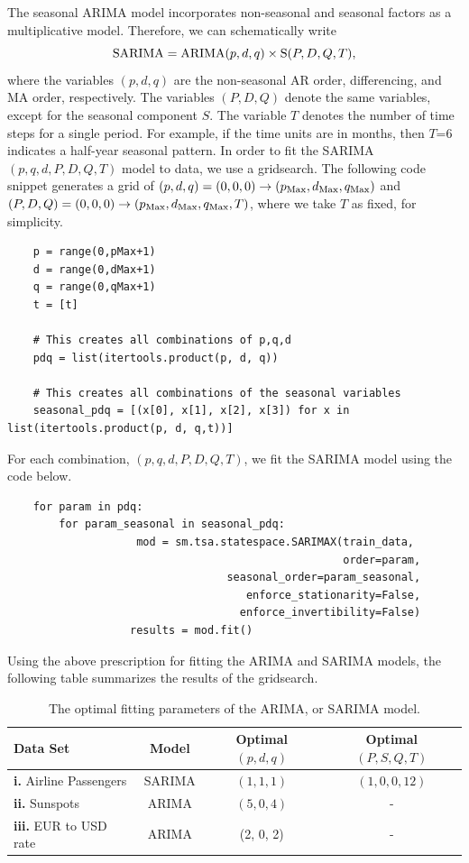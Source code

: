 \documentclass[10pt,a4paper]{article}
\begin{document}
The seasonal ARIMA model incorporates non-seasonal and seasonal factors as a multiplicative model. Therefore, we can schematically write
\begin{equation}
{\rm SARIMA} = {\rm ARIMA}(p,d,q) \times {\rm S}(P,D,Q,T),
\end{equation}
where the variables $(p,d,q)$ are the non-seasonal AR order, differencing, and MA order, respectively. The variables $(P,D,Q)$ denote the same variables, except for the seasonal component $S$. The variable $T$ denotes the number of time steps for a single period. For example, if the time units are in months, then $T$=6 indicates a half-year seasonal pattern. In order to fit the SARIMA$(p,q,d,P,D,Q,T)$ model to data, we use a gridsearch. The following code snippet generates a grid of $(p,d,q)=(0,0,0) \rightarrow (p_{\rm Max},d_{\rm Max},q_{\rm Max}) $ and $(P,D,Q)=(0,0,0) \rightarrow (p_{\rm Max},d_{\rm Max},q_{\rm Max},T) $, where we take $T$ as fixed, for simplicity.
\begin{lstlisting}
	p = range(0,pMax+1)
	d = range(0,dMax+1)
	q = range(0,qMax+1)
	t = [t]
	
	# This creates all combinations of p,q,d
	pdq = list(itertools.product(p, d, q))
	
	# This creates all combinations of the seasonal variables
	seasonal_pdq = [(x[0], x[1], x[2], x[3]) for x in list(itertools.product(p, d, q,t))]
\end{lstlisting}
For each combination, $(p,q,d,P,D,Q,T)$, we fit the SARIMA model using the code below.
\begin{lstlisting}
	for param in pdq:
		for param_seasonal in seasonal_pdq:
					mod = sm.tsa.statespace.SARIMAX(train_data,
                            					    order=param,
                            	  seasonal_order=param_seasonal,
                                     enforce_stationarity=False,
                                    enforce_invertibility=False)
				   results = mod.fit()
\end{lstlisting}


Using the above prescription for fitting the ARIMA and SARIMA models, the following table summarizes the results of the gridsearch.
\begin{table}[h]
\centering
\begin{tabular}{l | c | c | c}
 Data Set    &    Model  & Optimal $(p,d,q)$ &  Optimal $(P,S,Q,T)$ \\ \hline
{\bf i.} Airline Passengers & SARIMA & $(1, 1, 1)$ & $(1, 0, 0, 12)$ \\
{\bf ii.} Sunspots & ARIMA  & $(5,0,4)$ & - \\
{\bf iii.} EUR to USD rate & ARIMA & (2, 0, 2) & - 
\end{tabular}
\caption{The optimal fitting parameters of the ARIMA, or SARIMA model.}
\label{table: optimal fitting parameters ARIMA}
\end{table}
\end{document}

